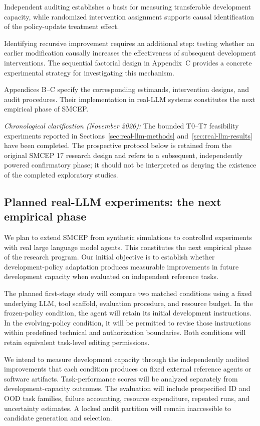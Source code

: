 \documentclass[11pt,a4paper]{article}
\begin{document}
Independent auditing establishes a basis for measuring transferable development capacity, while randomized intervention assignment supports causal identification of the policy-update treatment effect.

Identifying recursive improvement requires an additional step: testing whether an earlier modification causally increases the effectiveness of subsequent development interventions. The sequential factorial
design in Appendix~C provides a concrete experimental strategy for investigating this mechanism.

Appendices B--C specify the corresponding estimands, intervention designs, and audit procedures. Their implementation in real-LLM systems constitutes the next empirical phase of SMCEP.

\noindent\textit{Chronological clarification (November 2026):} The bounded T0--T7 feasibility experiments reported in Sections~\ref{sec:real-llm-methods} and~\ref{sec:real-llm-results} have been completed. The prospective protocol below is retained from the original SMCEP 17 research design and refers to a subsequent, independently powered confirmatory phase; it should not be interpreted as denying the existence of the completed exploratory studies.

\subsection{Planned real-LLM experiments: the next empirical phase}
We plan to extend SMCEP from synthetic simulations to controlled experiments with real large language
model agents. This constitutes the next empirical phase of the research program. Our initial objective
is to establish whether development-policy adaptation produces measurable improvements in future development capacity when evaluated on independent reference tasks.

The planned first-stage study will compare two matched conditions using a fixed underlying LLM,
tool scaffold, evaluation procedure, and resource budget. In the frozen-policy condition, the agent
will retain its initial development instructions. In the evolving-policy condition, it will be
permitted to revise those instructions within predefined technical and authorization boundaries.
Both conditions will retain equivalent task-level editing permissions.

We intend to measure development capacity through the independently audited improvements that each
condition produces on fixed external reference agents or software artifacts. Task-performance
scores will be analyzed separately from development-capacity outcomes. The evaluation
will include prespecified ID and OOD task families, failure accounting, resource expenditure,
repeated runs, and uncertainty estimates. A locked audit partition will remain inaccessible
to candidate generation and selection.
\end{document}

